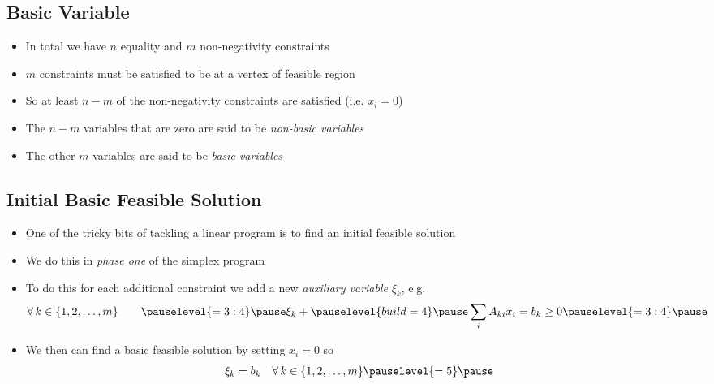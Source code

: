 
\begin{slide}
\section{Basic Variable}

\begin{PauseHighLight}
  \begin{itemize}
  \item In total we have $n$ equality and $m$ non-negativity constraints\pause
  \item $m$ constraints must be satisfied to be at a vertex of feasible
    region\pause
  \item So at least $n-m$ of the non-negativity constraints are
    satisfied (i.e. $x_i=0$)\pause
  \item The $n-m$ variables that are zero are said to be \emph{non-basic
    variables}\pause
  \item The other $m$ variables are said to be \emph{basic variables}\pause
  \end{itemize}
\end{PauseHighLight}

\end{slide}


\begin{slide}
\section[-2]{Initial Basic Feasible Solution}

\begin{PauseHighLight}
  \begin{itemize}
  \item One of the tricky bits of tackling a linear program is to find
    an initial feasible solution\pause
  \item We do this in \emph{phase one} of the simplex program\pause
  \item To do this for each additional constraint we add a new
    \emph{auxiliary variable} $\xi_k$, e.g.
    \begin{align*}
     \forall\, k\in\{1,2,\ldots, m\} \quad\quad\pauselevel{=3 :4}\pause
     \xi_k + \pauselevel{build =4}\pause\sum_i A_{ki} x_i &= b_k  \geq 0 \pauselevel{=3 :4}\pause
    \end{align*}
  \item We then can find a basic feasible solution by setting $x_i=0$ so
    \begin{align*}
      \xi_k &= b_k  \quad \forall\, k\in\{1,2,\ldots, m\}\pauselevel{=5}\pause
    \end{align*}
  \end{itemize}
\end{PauseHighLight}

\end{slide}

